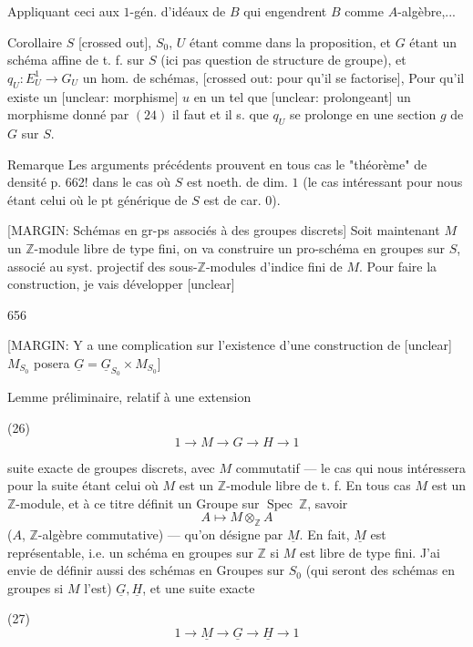 \newpage


Appliquant ceci aux $1$-gén. d'idéaux de
$B$ qui engendrent $B$ comme $A$-algèbre,...

Corollaire $S$ [crossed out], $S_0$, $U$ étant comme dans
la proposition, et $G$ étant un schéma affine
de t. f. sur $S$ (ici pas question de
structure de groupe), et $q_U: E^1_U \to G_U$ un
hom. de schémas, [crossed out: pour qu'il se factorise],
Pour qu'il existe un [unclear: morphisme] $u$
en un tel que [unclear: prolongeant] un morphisme
donné par $(24)$ il faut et il s. que
$q_U$ se prolonge en une section $g$ de $G$ sur $S$.

Remarque Les arguments précédents prouvent
en tous cas le "théorème" de densité p. 662!
dans le cas où $S$ est noeth. de dim. $1$
(le cas intéressant pour nous étant celui où
le pt générique de $S$ est de car. $0$).

[MARGIN:
Schémas en gr-ps
associés à des
groupes discrets]
Soit maintenant $M$ un $\mathbb{Z}$-module
libre de type fini, on va construire un
pro-schéma en groupes sur $S$, associé
au syst. projectif des sous-$\mathbb{Z}$-modules
d'indice fini de $M$. Pour faire la
construction, je vais développer [unclear]

\newpage


656

[MARGIN: Y a une complication sur l'existence d'une construction de [unclear] $M_{S_0}$ posera $\underline{G} = \underline{G}_{S_0} \times M_{S_0}$]

Lemme préliminaire, relatif à une extension

(26) $$1 \to M \to G \to H \to 1$$

suite exacte de groupes discrets, avec $M$ commutatif — le cas qui nous intéressera pour la suite étant celui où $M$ est un $\mathbb{Z}$-module libre de t. f. En tous cas $M$ est un $\mathbb{Z}$-module, et à ce titre définit un Groupe sur $\operatorname{Spec}\ \mathbb{Z}$, savoir 
$$A \longmapsto M \otimes_{\mathbb{Z}} A$$
($A$, $\mathbb{Z}$-algèbre commutative) — qu'on désigne par $\underline{M}$. En fait, $\underline{M}$ est représentable, i.e. un schéma en groupes sur $\mathbb{Z}$ si $M$ est libre de type fini. J'ai envie de définir aussi des schémas en Groupes sur $S_0$ (qui seront des schémas en groupes si $M$ l'est) $\underline{G}, \underline{H}$, et une suite exacte

(27) $$1 \to \underline{M} \to \underline{G} \to \underline{H} \to 1$$

